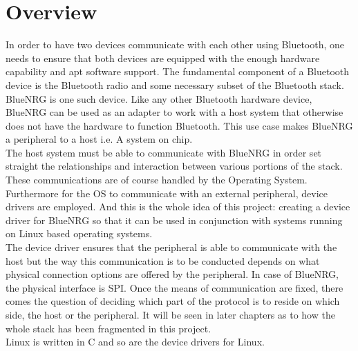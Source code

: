 \section{Overview}
In order to have two devices communicate with each other using Bluetooth, one needs to ensure that both devices are equipped with the enough hardware capability and apt software support. The fundamental component of a Bluetooth device is the Bluetooth radio and some necessary subset of the Bluetooth stack. BlueNRG is one such device. Like any other Bluetooth hardware device, BlueNRG can be used as an adapter to work with a host system that otherwise does not have the hardware to function Bluetooth. This use case makes BlueNRG a peripheral to a host i.e. A system on chip. \\
The host system must be able to communicate with BlueNRG in order set straight the relationships and interaction between various portions of the stack. These communications are of course handled by the Operating System. Furthermore for the OS to communicate with an external peripheral, device drivers are employed. And this is the whole idea of this project: creating a device driver for BlueNRG so that it can be used in conjunction with systems running on Linux based operating systems.\\
The device driver ensures that the peripheral is able to communicate with the host but the way this communication is to be conducted depends on what physical connection options are offered by the peripheral. In case of BlueNRG, the physical interface is SPI. Once the means of communication are fixed, there comes the question of deciding which part of the protocol is to reside on which side, the host or the peripheral. It will be seen in later chapters as to how the whole stack has been fragmented in this project.\\
Linux is written in C and so are the device drivers for Linux.
